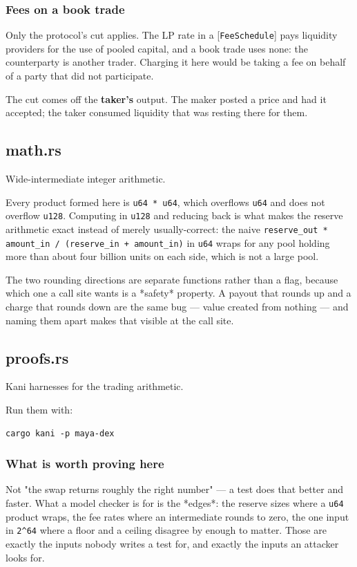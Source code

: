 \documentclass[11pt,a4paper]{article}
\begin{document}
\subsubsection{Fees on a book trade}

Only the protocol's cut applies. The LP rate in a [\texttt{FeeSchedule}] pays
liquidity providers for the use of pooled capital, and a book trade uses
none: the counterparty is another trader. Charging it here would be taking a
fee on behalf of a party that did not participate.

The cut comes off the \textbf{taker's} output. The maker posted a price and had
it accepted; the taker consumed liquidity that was resting there for them.

\subsection{math.rs}
Wide-intermediate integer arithmetic.

Every product formed here is \texttt{u64 * u64}, which overflows \texttt{u64} and does not
overflow \texttt{u128}. Computing in \texttt{u128} and reducing back is what makes the
reserve arithmetic exact instead of merely usually-correct: the naive
\texttt{reserve\_out * amount\_in / (reserve\_in + amount\_in)} in \texttt{u64} wraps for any
pool holding more than about four billion units on each side, which is not a
large pool.

The two rounding directions are separate functions rather than a flag,
because which one a call site wants is a *safety* property. A payout that
rounds up and a charge that rounds down are the same bug — value created
from nothing — and naming them apart makes that visible at the call site.

\subsection{proofs.rs}
Kani harnesses for the trading arithmetic.

Run them with:

\begin{verbatim}
cargo kani -p maya-dex
\end{verbatim}

\subsubsection{What is worth proving here}

Not "the swap returns roughly the right number" — a test does that better
and faster. What a model checker is for is the *edges*: the reserve sizes
where a \texttt{u64} product wraps, the fee rates where an intermediate rounds to
zero, the one input in \texttt{2\textasciicircum{}64} where a floor and a ceiling disagree by enough
to matter. Those are exactly the inputs nobody writes a test for, and
exactly the inputs an attacker looks for.
\end{document}
